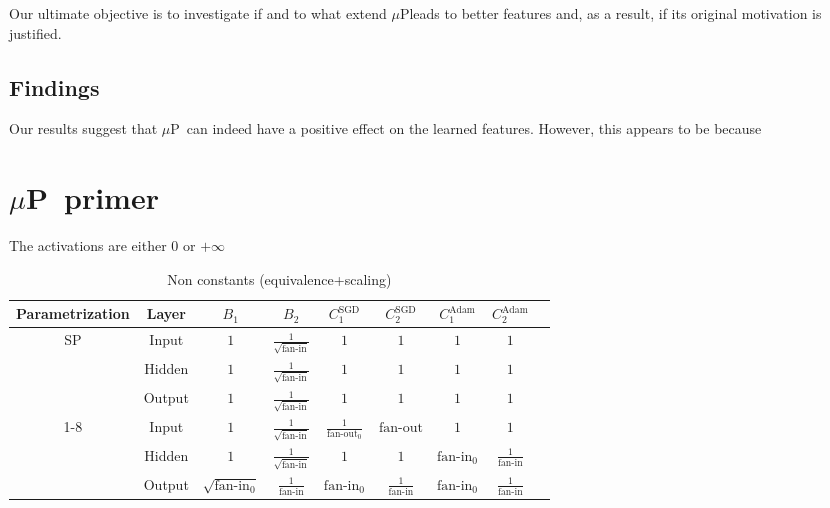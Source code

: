\documentclass{article}
\newcommand{\mup}{$\mu$P}
\newcommand{\fanin}{\text{fan-in}}
\newcommand{\fanout}{\text{fan-out}}
\begin{document}
Our ultimate objective is to investigate if and to what extend \mup leads to better features and, as a result, if its original motivation is justified.

\subsection{Findings}


Our results suggest that \mup\ can indeed have a positive effect on the learned features. However, this appears to be because


\section{\mup\ primer}
The activations are either $0$ or $+\infty$
\begin{table}[h!]
\footnotesize
\Centering
\begin{tabular}{ccccccccp{10em}}
\toprule
Parametrization & Layer & $B_1$ & $B_2$ & $C^{\text{SGD}}_1$ & $C^{\text{SGD}}_2$ & $C^{\text{Adam}}_1$ & $C^{\text{Adam}}_2$\\
\midrule
\multirow{3}{*}{SP} & Input & $1$ & $\frac{1}{\sqrt{\fanin}}$ & $1$ & $1$ & $1$ & $1$\\
& Hidden & $1$ & $\frac{1}{\sqrt{\fanin}}$ & $1$ & $1$ & $1$ & $1$\\
& Output & $1$ & $\frac{1}{\sqrt{\fanin}}$ & $1$ & $1$ & $1$ & $1$\\
\cmidrule{1-8}
\multirow{3}{*}{$\mu$P} & Input & $1$ & $\frac{1}{\sqrt{\fanin}}$ & $\frac{1}{\fanout_0}$ & $\fanout$ & $1$ & $1$ \\
& Hidden & $1$ & $\frac{1}{\sqrt{\fanin}}$ & $1$ & $1$ & $\fanin_0$ & $\frac{1}{\fanin}$\\
& Output & $\sqrt{\fanin_0}$ & $\frac{1}{\fanin}$ & $\fanin_0$ & $\frac{1}{\fanin}$ & $\fanin_0$ & $\frac{1}{\fanin}$\\
\bottomrule
\end{tabular}
\caption{Non constants (equivalence+scaling)}
\end{table}
\end{document}

